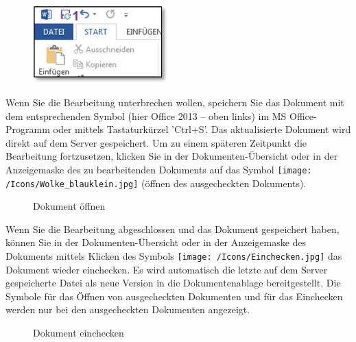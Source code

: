 \vspace{\baselineskip}

\begin{figure}
\vspace{-15pt}
\includegraphics[height=30mm]{../chapters/11_Dokumentenablage/pictures/11-2-7_WordSpeichern.jpg}
\end{figure}
Wenn Sie die Bearbeitung unterbrechen wollen, speichern Sie das Dokument mit dem entsprechenden Symbol  (hier Office 2013 -- oben links) im MS Office-Programm oder mittels Tastaturkürzel 'Ctrl+S'. Das aktualisierte Dokument wird direkt auf dem Server gespeichert. Um zu einem späteren Zeitpunkt die Bearbeitung fortzusetzen, klicken Sie in der Dokumenten-Übersicht oder in der Anzeigemaske des zu bearbeitenden Dokuments auf das Symbol \texttt{[image: /Icons/Wolke\_blauklein.jpg]}  (öffnen des ausgecheckten Dokuments).

\begin{figure}[H]
\caption{Dokument öffnen}
\end{figure}

Wenn Sie die Bearbeitung abgeschlossen und das Dokument gespeichert haben, können Sie in der Dokumenten-Übersicht oder in der Anzeigemaske des
Dokuments mittels Klicken des Symbols \texttt{[image: /Icons/Einchecken.jpg]}  das Dokument wieder einchecken. Es wird automatisch die letzte auf dem Server gespeicherte Datei als neue Version in die Dokumentenablage bereitgestellt. Die Symbole für das Öffnen von ausgecheckten Dokumenten und für das Einchecken werden nur bei den ausgecheckten Dokumenten angezeigt.

\begin{figure}[H]
\caption{Dokument einchecken}
\end{figure}


